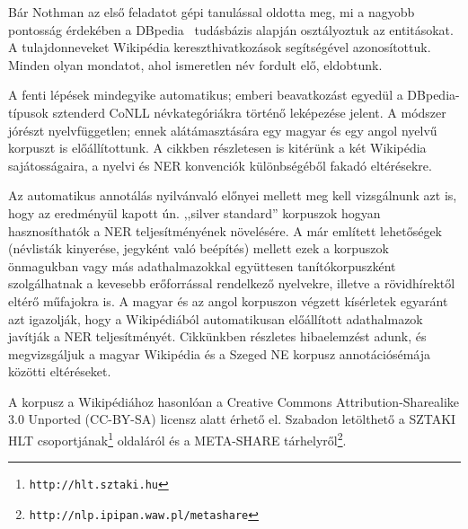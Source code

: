 \documentclass{llncs}
\begin{document}
Bár Nothman az első feladatot gépi tanulással oldotta meg, mi a nagyobb
pontosság érdekében a DBpedia~\cite{Bizer:09} tudásbázis alapján osztályoztuk az
entitásokat. A tulajdonneveket Wikipédia kereszthivatkozások segítségével azonosítottuk.
Minden olyan mondatot, ahol ismeretlen név fordult elő, eldobtunk.

A fenti lépések mindegyike automatikus; emberi beavatkozást egyedül a DBpedia-típusok
sztenderd CoNLL névkategóriákra történő leképezése jelent. A módszer jórészt
nyelvfüggetlen; ennek alátámasztására egy magyar és egy angol nyelvű korpuszt is
előállítottunk. A cikkben részletesen is kitérünk a két Wikipédia sajátosságaira, a
nyelvi és NER konvenciók különbségéből fakadó eltérésekre.


Az automatikus annotálás nyilvánvaló előnyei mellett meg kell vizsgálnunk azt is, hogy az
eredményül kapott  ún. ,,silver standard'' korpuszok hogyan hasznosíthatók a NER
teljesítményének növelésére. A már említett lehetőségek (névlisták kinyerése, jegyként
való beépítés) mellett ezek a korpuszok önmagukban vagy más adathalmazokkal együttesen
tanítókorpuszként szolgálhatnak a kevesebb erőforrással rendelkező nyelvekre, illetve a
rövidhírektől eltérő műfajokra is. A magyar és az angol korpuszon végzett kísérletek
egyaránt azt igazolják, hogy a Wikipédiából automatikusan előállított adathalmazok
javítják a NER teljesítményét. Cikkünkben részletes hibaelemzést adunk, és megvizsgáljuk
a magyar Wikipédia és a Szeged NE korpusz\cite{Szarvas:06} annotációsémája közötti
eltéréseket.


A korpusz a Wikipédiához hasonlóan a Creative Commons Attribution-Sharealike
3.0 Unported (CC-BY-SA) licensz alatt érhető el. Szabadon letölthető a SZTAKI HLT
csoportjának\footnote{\texttt{http://hlt.sztaki.hu}} oldaláról és a META-SHARE
tárhelyről\footnote{\texttt{http://nlp.ipipan.waw.pl/metashare}}.


%
%


\end{document}
